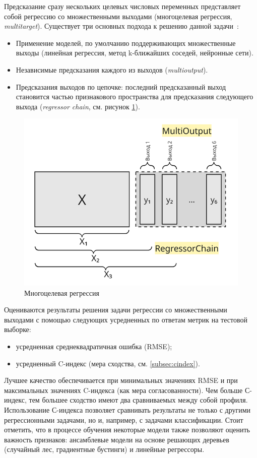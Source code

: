 Предсказание сразу нескольких целевых числовых переменных представляет собой регрессию со множественными выходами (многоцелевая регрессия, \emph{multitarget}). Существует три основных подхода к решению данной задачи~\cite{Spyromitros, Bishop}:
\begin{itemize}
    \item Применение моделей, по умолчанию поддерживающих множественные выходы (линейная регрессия, метод k-ближайших соседей, нейронные сети).
    \item Независимые предсказания каждого из выходов (\emph{multioutput}).
    \item Предсказания выходов по цепочке: последний предсказанный выход становится частью признакового пространства для предсказания следующего выхода (\emph{regressor chain}, см. рисунок \ref{fig:multioutput_regr}).
\end{itemize}

\begin{figure}[ht]
    \centering
    \includegraphics[width=0.75\linewidth]{figures/multioutput.png}
    \caption{Многоцелевая регрессия}
    \label{fig:multioutput_regr}
\end{figure}

Оцениваются результаты решения задачи регрессии со множественными выходами с помощью следующих усредненных по ответам метрик на тестовой выборке:
\begin{itemize}
    \item усредненная среднеквадратичная ошибка (RMSE);
    \item усредненный C-индекс (мера сходства, см. \ref{subsec:cindex}).
\end{itemize}

Лучшее качество обеспечивается при минимальных значениях RMSE и при максимальных значениях C-индекса (как мера согласованности). Чем больше С-индекс, тем большее сходство имеют два сравниваемых между собой профиля. Использование С-индекса позволяет сравнивать результаты не только с другими регрессионными задачами, но и, например, с задачами классификации. Стоит отметить, что в процессе обучения некоторые модели также позволяют оценить важность признаков: ансамблевые модели на основе решающих деревьев (случайный лес, градиентные бустинги) и линейные регрессоры.


